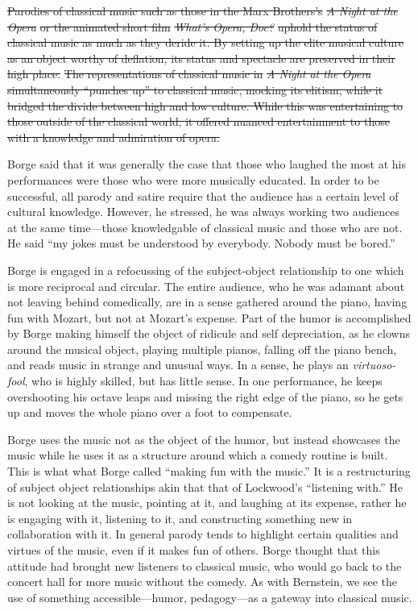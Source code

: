 \documentclass[12pt,letterpaper]{article}
\providecommand{\DIFdel}[1]{{\protect\color{red}\sout{#1}}}                      %
\providecommand{\DIFdelbegin}{} %
\providecommand{\DIFdelend}{} %
\newcommand{\DIFscaledelfig}{0.5}
\newlength{\DIFdelgraphicswidth} %
\newlength{\DIFdelgraphicsheight} %
\newcommand{\DIFdelincludegraphics}[2][]{%
\sbox{\DIFdelgraphicsbox}{\DIFOincludegraphics[#1]{#2}}%
\settoboxwidth{\DIFdelgraphicswidth}{\DIFdelgraphicsbox} %
\settoboxtotalheight{\DIFdelgraphicsheight}{\DIFdelgraphicsbox} %
\scalebox{\DIFscaledelfig}{%
\parbox[b]{\DIFdelgraphicswidth}{\usebox{\DIFdelgraphicsbox}\\[-\baselineskip] \rule{\DIFdelgraphicswidth}{0em}}\llap{\resizebox{\DIFdelgraphicswidth}{\DIFdelgraphicsheight}{%
\setlength{\unitlength}{\DIFdelgraphicswidth}%
\begin{picture}(1,1)%
\thicklines\linethickness{2pt} %
{\color[rgb]{1,0,0}\put(0,0){\framebox(1,1){}}}%
{\color[rgb]{1,0,0}\put(0,0){\line( 1,1){1}}}%
{\color[rgb]{1,0,0}\put(0,1){\line(1,-1){1}}}%
\end{picture}%
}\hspace*{3pt}}} %
} %
\DeclareRobustCommand{\DIFdelbegin}{\DIFOdelbegin \let\includegraphics\DIFdelincludegraphics} %
\DeclareRobustCommand{\DIFdelend}{\DIFOaddend \let\includegraphics\DIFOincludegraphics} %
\begin{document}
	\DIFdelbegin \DIFdel{Parodies of classical music such as those in the Marx Brothers's 
	}\textit{\DIFdel{A Night at the Opera}} %
\DIFdel{or the animated short film 
	}\textit{\DIFdel{What's Opera, 
	Doc?}} %
\DIFdel{uphold the status of classical music as much as they deride it. By
	setting up the elite musical culture as an object worthy of deflation, 
	its status and spectacle are preserved in their high 
	place.}%
\DIFdel{The representations of classical music in
	}\textit{\DIFdel{A Night at the Opera}} %
\DIFdel{simultaneously ``punches up'' to classical
	music, mocking its elitism, while it bridged the divide between high and
	low culture. While this was entertaining to those outside of the 
	classical world, it offered nuanced entertainment to those with a 
	knowledge and admiration of opera.}%

\DIFdelend Borge said that it was generally the case that those who laughed
	the most at his performances were those who were more musically 
	educated. In order to be successful, all parody and satire require that
	the audience has a certain level of cultural 
	knowledge.\autocite[249]{Garrett} However, he stressed, he was always 
	working two audiences at the same time---those knowledgable of classical
	music and those who are not. He said ``my jokes must be understood by 
	everybody. Nobody must be bored.''\autocite[256]{Garrett} 

 	Borge is engaged in a refocussing of the subject-object 
	relationship to one which is more reciprocal and circular. The entire 
	audience, who he was adamant about not leaving behind comedically, are
	in a sense gathered around the piano, having fun with Mozart, but not at
	Mozart's expense. Part of the humor is accomplished by Borge making 
	himself
	the object of ridicule and self depreciation, as he clowns around the
	musical object, playing multiple pianos, falling off the piano bench,
	and reads music in strange and unusual ways. In a sense, he plays an
	\textit{virtuoso-fool}, who is highly skilled, but has little sense. 
	In one performance, he keeps overshooting his octave leaps and missing
	the right edge of the piano, so he gets up and moves the whole piano
	over a foot to compensate. 

	Borge uses the music not as the object of the humor, but instead
	showcases the music while he uses it as a structure
	around which a comedy routine is built. 
	This is what what Borge called ``making fun with the music.'' It is a 
	restructuring
	of subject object relationships akin that that of Lockwood's ``listening
	with.'' He is not looking at the music, pointing at it, and laughing at
	its expense, rather he is engaging with it, listening to it, and 
	constructing something new in collaboration with it. In general parody 
	tends to highlight certain qualities and virtues of the music, even if 
	it makes fun of others. Borge thought that this attitude had brought
	new listeners to classical music, who would go back to the concert hall 
	for more music without the comedy.\autocite[256]{Garrett} As with 
	Bernstein, we see the use of something accessible---humor,
	pedagogy---as a gateway into classical music.
\end{document}
